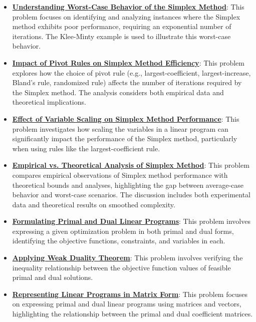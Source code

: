 \documentclass{article}%
\begin{document}
\begin{itemize}[leftmargin=*]
\item \href{https://www.math.purdue.edu/~yipn/421/2024-09-05-SimplexEfficiency.pdf#page=2}{\textbf{Understanding Worst{-}Case Behavior of the Simplex Method}}: This problem focuses on identifying and analyzing instances where the Simplex method exhibits poor performance, requiring an exponential number of iterations. The Klee-Minty example is used to illustrate this worst-case behavior. %
\item \href{https://www.math.purdue.edu/~yipn/421/2024-09-05-SimplexEfficiency.pdf#page=3}{\textbf{Impact of Pivot Rules on Simplex Method Efficiency}}: This problem explores how the choice of pivot rule (e.g., largest-coefficient, largest-increase, Bland's rule, randomized rule) affects the number of iterations required by the Simplex method. The analysis considers both empirical data and theoretical implications. %
\item \href{https://www.math.purdue.edu/~yipn/421/2024-09-05-SimplexEfficiency.pdf#page=5}{\textbf{Effect of Variable Scaling on Simplex Method Performance}}: This problem investigates how scaling the variables in a linear program can significantly impact the performance of the Simplex method, particularly when using rules like the largest-coefficient rule. %
\item \href{https://www.math.purdue.edu/~yipn/421/2024-09-05-SimplexEfficiency.pdf#page=9}{\textbf{Empirical vs. Theoretical Analysis of Simplex Method}}: This problem compares empirical observations of Simplex method performance with theoretical bounds and analyses, highlighting the gap between average-case behavior and worst-case scenarios. The discussion includes both experimental data and theoretical results on smoothed complexity. %
\item \href{https://www.math.purdue.edu/~yipn/421/2024-09-12-Duality.pdf#page=1}{\textbf{Formulating Primal and Dual Linear Programs}}: This problem involves expressing a given optimization problem in both primal and dual forms, identifying the objective functions, constraints, and variables in each. %
\item \href{https://www.math.purdue.edu/~yipn/421/2024-09-12-Duality.pdf#page=2}{\textbf{Applying Weak Duality Theorem}}: This problem involves verifying the inequality relationship between the objective function values of feasible primal and dual solutions. %
\item \href{https://www.math.purdue.edu/~yipn/421/2024-09-12-Duality.pdf#page=3}{\textbf{Representing Linear Programs in Matrix Form}}: This problem focuses on expressing primal and dual linear programs using matrices and vectors, highlighting the relationship between the primal and dual coefficient matrices. %

\end{itemize}
\end{document}
